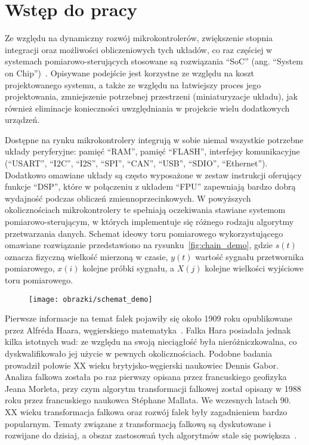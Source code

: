 \chapter{Wstęp do pracy}

Ze względu na dynamiczny rozwój mikrokontrolerów, zwiększenie stopnia integracji oraz możliwości obliczeniowych tych układów, co raz częściej w systemach pomiarowo-sterujących stosowane są rozwiązania \enquote{SoC} (ang. \enquote{System on Chip})~\cite{saleh_systemonchip}. Opisywane podejście jest korzystne ze względu na koszt projektowanego systemu, a także ze względu na łatwiejszy proces jego projektowania, zmniejszenie potrzebnej przestrzeni (miniaturyzacje układu), jak również eliminacje konieczności uwzględniania w projekcie wielu dodatkowych urządzeń.

Dostępne na rynku mikrokontrolery integrują w sobie niemal wszystkie potrzebne układy peryferyjne: pamięć \enquote{RAM}, pamięć \enquote{FLASH}, interfejsy komunikacyjne (\enquote{USART}, \enquote{I2C}, \enquote{I2S}, \enquote{SPI}, \enquote{CAN}, \enquote{USB}, \enquote{SDIO}, \enquote{Ethernet}). Dodatkowo omawiane układy są często wyposażone w zestaw instrukcji oferujący funkcje \enquote{DSP}, które w połączeniu z układem \enquote{FPU} zapewniają bardzo dobrą wydajność podczas obliczeń zmiennoprzecinkowych. W powyższych okolicznościach mikrokontrolery te spełniają oczekiwania stawiane systemom pomiarowo-sterującym, w których implementuje się różnego rodzaju algorytmy przetwarzania danych. Schemat ideowy toru pomiarowego wykorzystującego omawiane rozwiązanie przedstawiono na rysunku~\ref{fig:chain_demo}, gdzie $s(t)$ oznacza fizyczną wielkość mierzoną w czasie, $y(t)$ wartość sygnału przetwornika pomiarowego, $x(i)$ kolejne próbki sygnału, a $X(j)$ kolejne wielkości wyjściowe toru pomiarowego.

\begin{figure}[htb!]
\begin{center}
\texttt{[image: obrazki/schemat\_demo]}
\end{center}
\end{figure}

Pierwsze informacje na temat falek pojawiły się około 1909 roku opublikowane przez Alfréda Haara, węgierskiego matematyka~\cite{haar_basics}. Falka Hara posiadała jednak kilka istotnych wad: ze względu na swoją nieciągłość była nieróżniczkowalna, co dyskwalifikowało jej użycie w pewnych okolicznościach. Podobne badania prowadził połowie XX wieku brytyjsko-węgierski naukowiec Dennis Gabor. Analiza falkowa została po raz pierwszy opisana przez francuskiego geofizyka Jeana Morleta, przy czym algorytm transformacji falkowej został opisany w 1988 roku przez francuskiego naukowca Stéphane Mallata. We wczesnych latach 90. XX wieku transformacja falkowa oraz rozwój falek były zagadnieniem bardzo popularnym. Tematy związane z transformacją falkową są dyskutowane i rozwijane do dzisiaj, a obszar zastosowań tych algorytmów stale się powiększa~\cite{akujuobi_applications}.

